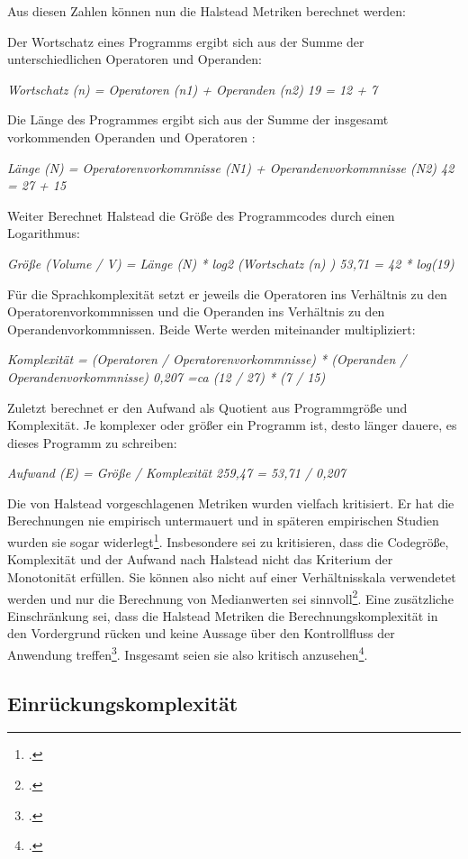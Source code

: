 Aus diesen Zahlen können nun die Halstead Metriken berechnet werden:

Der Wortschatz eines Programms ergibt sich aus der Summe der
unterschiedlichen Operatoren und Operanden:

\emph{Wortschatz (n) = Operatoren (n1) + Operanden (n2) 19 = 12 + 7}

Die Länge des Programmes ergibt sich aus der Summe der insgesamt
vorkommenden Operanden und Operatoren :

\emph{Länge (N) = Operatorenvorkommnisse (N1) + Operandenvorkommnisse
(N2) 42 = 27 + 15}

Weiter Berechnet Halstead die Größe des Programmcodes durch einen
Logarithmus:

\emph{Größe (Volume / V) = Länge (N) * log2 (Wortschatz (n) ) 53,71 = 42
* log(19)}

Für die Sprachkomplexität setzt er jeweils die Operatoren ins Verhältnis
zu den Operatorenvorkommnissen und die Operanden ins Verhältnis zu den
Operandenvorkommnissen. Beide Werte werden miteinander multipliziert:

\emph{Komplexität = (Operatoren / Operatorenvorkommnisse) * (Operanden /
Operandenvorkommnisse) 0,207 =ca (12 / 27) * (7 / 15)}

Zuletzt berechnet er den Aufwand als Quotient aus Programmgröße und
Komplexität. Je komplexer oder größer ein Programm ist, desto länger
dauere, es dieses Programm zu schreiben:

\emph{Aufwand (E) = Größe / Komplexität 259,47 = 53,71 / 0,207}

Die von Halstead vorgeschlagenen Metriken wurden vielfach kritisiert. Er
hat die Berechnungen nie empirisch untermauert und in späteren
empirischen Studien wurden sie sogar widerlegt\footcite[Vgl. ][]{(Sneed et al
  2010:185)}. Insbesondere sei zu kritisieren, dass die Codegröße,
Komplexität und der Aufwand nach Halstead nicht das Kriterium der
Monotonität erfüllen. Sie können also nicht auf einer Verhältnisskala
verwendetet werden und nur die Berechnung von Medianwerten sei
sinnvoll\footcite[Vgl. ][]{Zuse, H. 1991, S. 142}. Eine zusätzliche Einschränkung
sei, dass die Halstead Metriken die Berechnungskomplexität in den
Vordergrund rücken und keine Aussage über den Kontrollfluss der
Anwendung treffen\footcite[Vgl. ][]{(Rumreich and Kecskemety 2019:2, Quelle 16
  dort}. Insgesamt seien sie also kritisch anzusehen\footcite[Vgl. ][]{(Sneed et
  al 2010:185)}.


\subsection{Einrückungskomplexität}\label{Einruckungskomplexitat}

